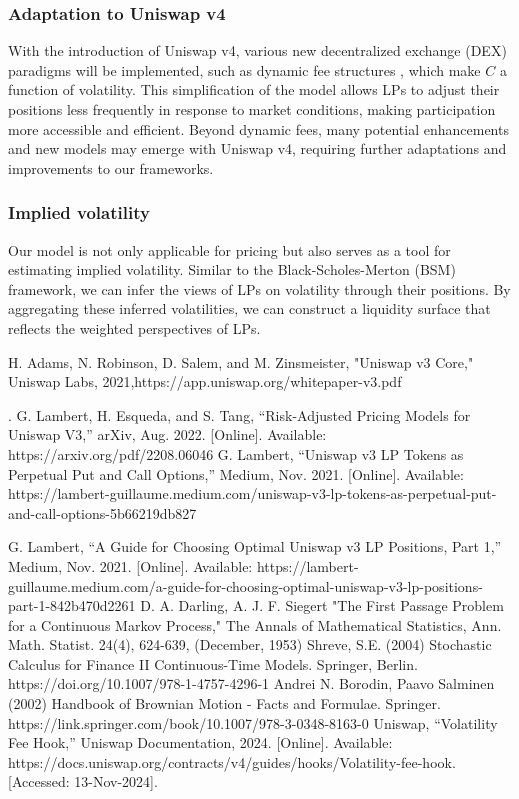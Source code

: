 \documentclass[conference]{IEEEtran}
\begin{document}
\subsubsection{Adaptation to Uniswap v4}
With the introduction of Uniswap v4, various new decentralized exchange (DEX) paradigms will be implemented, such as dynamic fee structures \cite{b7}, which make \(C\) a function of volatility. This simplification of the model allows LPs to adjust their positions less frequently in response to market conditions, making participation more accessible and efficient. Beyond dynamic fees, many potential enhancements and new models may emerge with Uniswap v4, requiring further adaptations and improvements to our frameworks.

\subsubsection{Implied volatility }
Our model is not only applicable for pricing but also serves as a tool for estimating implied volatility. Similar to the Black-Scholes-Merton (BSM) framework, we can infer the views of LPs on volatility through their positions. By aggregating these inferred volatilities, we can construct a liquidity surface that reflects the weighted perspectives of LPs.


\begin{thebibliography}{00}
 H. Adams, N. Robinson, D. Salem, and M. Zinsmeister, "Uniswap v3 Core," Uniswap Labs, 2021,https://app.uniswap.org/whitepaper-v3.pdf

.
 G. Lambert, H. Esqueda, and S. Tang, ``Risk-Adjusted Pricing Models for Uniswap V3,'' arXiv, Aug. 2022. [Online]. Available: https://arxiv.org/pdf/2208.06046
 G. Lambert, ``Uniswap v3 LP Tokens as Perpetual Put and Call Options,'' Medium, Nov. 2021. [Online]. Available: https://lambert-guillaume.medium.com/uniswap-v3-lp-tokens-as-perpetual-put-and-call-options-5b66219db827

 G. Lambert, ``A Guide for Choosing Optimal Uniswap v3 LP Positions, Part 1,'' Medium, Nov. 2021. [Online]. Available: https://lambert-guillaume.medium.com/a-guide-for-choosing-optimal-uniswap-v3-lp-positions-part-1-842b470d2261
 D. A. Darling, A. J. F. Siegert "The First Passage Problem for a Continuous Markov Process," The Annals of Mathematical Statistics, Ann. Math. Statist. 24(4), 624-639, (December, 1953)
 Shreve, S.E. (2004) Stochastic Calculus for Finance II Continuous-Time Models. Springer, Berlin.
https://doi.org/10.1007/978-1-4757-4296-1
 Andrei N. Borodin, Paavo Salminen (2002) Handbook of Brownian Motion - Facts and Formulae. Springer. https://link.springer.com/book/10.1007/978-3-0348-8163-0
 Uniswap, ``Volatility Fee Hook,'' Uniswap Documentation, 2024. [Online]. Available: https://docs.uniswap.org/contracts/v4/guides/hooks/Volatility-fee-hook. [Accessed: 13-Nov-2024].
\end{thebibliography}
\vspace{12pt}
\end{document}
